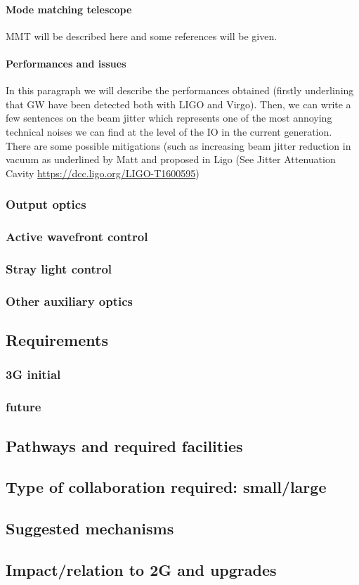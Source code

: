 \paragraph{Mode matching telescope}
MMT will be described here and some references will be given.
\paragraph {Performances and issues}
 In this paragraph we will describe the performances obtained (firstly underlining that GW have been detected both with LIGO and Virgo). Then, we can write a few sentences on the beam jitter which represents one of the most annoying technical noises we can find at the level of the IO in the current generation. There are some possible mitigations (such as increasing beam jitter reduction in vacuum as underlined by Matt and proposed in Ligo (See Jitter Attenuation Cavity \url{https://dcc.ligo.org/LIGO-T1600595})



\subsubsection{Output optics}
\subsubsection{Active wavefront control}
\subsubsection{Stray light control}
\subsubsection{Other auxiliary optics}

\subsection{Requirements}
\subsubsection{3G initial}
\subsubsection{future}
\subsection{Pathways and required facilities}
\subsection{Type of collaboration required:  small/large}
\subsection{Suggested mechanisms}
\subsection{Impact/relation to 2G and upgrades}